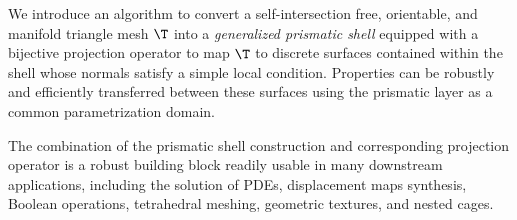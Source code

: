 We introduce an algorithm to convert a self-intersection free, orientable, and manifold triangle mesh $\T$ into a \emph{generalized prismatic shell} equipped with a bijective projection operator to map $\T$ to  discrete surfaces contained within the shell whose normals satisfy a simple local condition. Properties can be robustly and efficiently transferred between these surfaces using the prismatic layer as a common parametrization domain. %

The combination of the prismatic shell construction and corresponding projection operator is a robust building block readily usable in many downstream applications, including the solution of PDEs, displacement maps synthesis, Boolean operations, tetrahedral meshing, geometric textures, and nested cages.